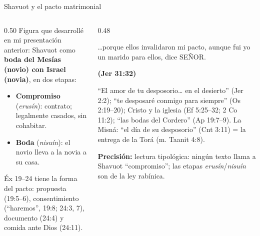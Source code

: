 \documentclass[hyperref={bookmarks=false},aspectratio=169]{beamer}
\newcommand{\SENOR}{S{\fontsize{0.78em}{1em}\selectfont EÑOR}}
\newcommand{\fuente}[1]{\par\hfill{\upshape\bfseries\footnotesize\textcolor{tierraroja}{#1}}}
\newcommand{\destacar}[1]{\textbf{\textcolor{tierraroja}{#1}}}
\newcommand{\precision}[1]{{\footnotesize\color{sepia}\textbf{Precisión:} #1}}
\begin{document}
\begin{frame}{Shavuot y el pacto matrimonial}
\begin{columns}[t,onlytextwidth]
\begin{column}{0.50\textwidth}\small\RaggedRight
Figura que desarrollé en mi presentación anterior: Shavuot como \destacar{boda del Mesías (novio) con Israel (novia)}, en dos etapas:
\begin{itemize}
\item \textbf{Compromiso} (\emph{erusín}): contrato; legalmente casados, sin cohabitar.
\item \textbf{Boda} (\emph{nisuín}): el novio lleva a la novia a su casa.
\end{itemize}
Éx 19--24 tiene la forma del pacto: propuesta (19:5--6), consentimiento (``haremos'', 19:8; 24:3, 7), documento (24:4) y comida ante Dios (24:11).
\end{column}
\begin{column}{0.48\textwidth}\scriptsize\RaggedRight
\begin{cita}\ldots{}porque ellos invalidaron mi pacto, aunque fui yo un marido para ellos, dice \SENOR.\fuente{(Jer 31:32)}\end{cita}
``El amor de tu desposorio\ldots{} en el desierto'' (Jer 2:2); ``te desposaré conmigo para siempre'' (Os 2:19--20); Cristo y la iglesia (Ef 5:25--32; 2 Co 11:2); ``las bodas del Cordero'' (Ap 19:7--9). La Misná: ``el día de su desposorio'' (Cnt 3:11) = la entrega de la Torá (m. Taanit 4:8).\par\smallskip
\precision{lectura tipológica: ningún texto llama a Shavuot ``compromiso''; las etapas \emph{erusín}/\emph{nisuín} son de la ley rabínica.}
\end{column}
\end{columns}
\end{frame}
\end{document}
